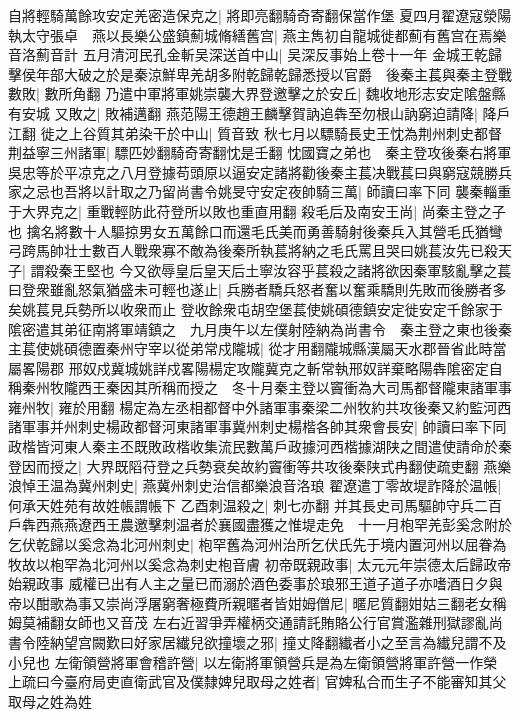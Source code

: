 自將輕騎萬餘攻安定羌密造保克之|{
	將即亮翻騎奇寄翻保當作堡}
夏四月翟遼寇滎陽執太守張卓　燕以長樂公盛鎮薊城脩繕舊宫|{
	燕主雋初自龍城徙都薊有舊宫在焉樂音洛薊音計}
五月清河民孔金斬吴深送首中山|{
	吴深反事始上卷十一年}
金城王乾歸擊侯年部大破之於是秦涼鮮卑羌胡多附乾歸乾歸悉授以官爵　後秦主萇與秦主登戰數敗|{
	數所角翻}
乃遣中軍將軍姚崇襲大界登邀擊之於安丘|{
	魏收地形志安定隂盤縣有安城}
又敗之|{
	敗補邁翻}
燕范陽王德趙王麟擊賀訥追犇至勿根山訥窮迫請降|{
	降戶江翻}
徙之上谷質其弟染干於中山|{
	質音致}
秋七月以驃騎長史王忱為荆州刺史都督荆益寧三州諸軍|{
	驃匹妙翻騎奇寄翻忱是壬翻}
忱國寶之弟也　秦主登攻後秦右將軍吳忠等於平凉克之八月登據苟頭原以逼安定諸將勸後秦主萇决戰萇曰與窮寇競勝兵家之忌也吾將以計取之乃留尚書令姚旻守安定夜帥騎三萬|{
	師讀曰率下同}
襲秦輜重于大界克之|{
	重戰輕防此苻登所以敗也重直用翻}
殺毛后及南安王尚|{
	尚秦主登之子也}
擒名將數十人驅掠男女五萬餘口而還毛氏美而勇善騎射後秦兵入其營毛氏猶彎弓跨馬帥壮士數百人戰衆寡不敵為後秦所執萇將納之毛氏罵且哭曰姚萇汝先已殺天子|{
	謂殺秦王堅也}
今又欲辱皇后皇天后土寧汝容乎萇殺之諸將欲因秦軍駭亂擊之萇曰登衆雖亂怒氣猶盛未可輕也遂止|{
	兵勝者驕兵怒者奮以奮乘驕則先敗而後勝者多矣姚萇見兵勢所以收衆而止}
登收餘衆屯胡空堡萇使姚碩德鎮安定徙安定千餘家于隂密遣其弟征南將軍靖鎮之　九月庚午以左僕射陸納為尚書令　秦主登之東也後秦主萇使姚碩德置秦州守宰以從弟常戍隴城|{
	從才用翻隴城縣漢屬天水郡晉省此時當屬畧陽郡}
邢奴戍冀城姚詳戍畧陽楊定攻隴冀克之斬常執邢奴詳棄略陽犇隂密定自稱秦州牧隴西王秦因其所稱而授之　冬十月秦主登以竇衝為大司馬都督隴東諸軍事雍州牧|{
	雍於用翻}
楊定為左丞相都督中外諸軍事秦梁二州牧約共攻後秦又約監河西諸軍事并州刺史楊政都督河東諸軍事冀州刺史楊楷各帥其衆會長安|{
	帥讀曰率下同}
政楷皆河東人秦主丕既敗政楷收集流民數萬戶政據河西楷據湖陕之間遣使請命於秦登因而授之|{
	大界既䧟苻登之兵勢衰矣故約竇衝等共攻後秦陕式冉翻使疏吏翻}
燕樂浪悼王温為冀州刺史|{
	燕冀州刺史治信都樂浪音洛琅}
翟遼遣丁零故堤詐降於温帳|{
	何承天姓苑有故姓帳謂帳下}
乙酉刺温殺之|{
	刺七亦翻}
并其長史司馬驅帥守兵二百戶犇西燕燕遼西王農邀擊刺温者於襄國盡獲之惟堤走免　十一月枹罕羌彭奚念附於乞伏乾歸以奚念為北河州刺史|{
	枹罕舊為河州治所乞伏氏先于境内置河州以屈眷為牧故以枹罕為北河州以奚念為刺史枹音膚}
初帝既親政事|{
	太元元年崇德太后歸政帝始親政事}
威權已出有人主之量已而溺於酒色委事於琅邪王道子道子亦嗜酒日夕與帝以酣歌為事又崇尚浮屠窮奢極費所親暱者皆姏姆僧尼|{
	暱尼質翻姏姑三翻老女稱姆莫補翻女師也又音茂}
左右近習爭弄權柄交通請託賄賂公行官賞濫雜刑獄謬亂尚書令陸納望宫闕歎曰好家居纎兒欲撞壞之邪|{
	撞丈降翻纎者小之至言為纎兒謂不及小兒也}
左衛領營將軍會稽許營|{
	以左衛將軍領營兵是為左衛領營將軍許營一作榮}
上疏曰今臺府局吏直衛武官及僕隸婢兒取母之姓者|{
	官婢私合而生子不能審知其父取母之姓為姓}
